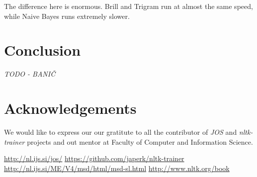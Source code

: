 \documentclass[11pt, conference, compsocconf]{IEEEtran}
\begin{document}
The difference here is enormous. Brill and Trigram run at almost the same speed, while Naive Bayes runs extremely slower.

\section{Conclusion} %
\textit{TODO - BANIČ}

\section*{Acknowledgements}
We would like to express our our gratitute to all the contributor of \textit{JOS} \cite{JOS} and  \textit{nltk-trainer} \cite{nltk-trainer} projects and out mentor at Faculty of Computer and Information Science.

\begin{thebibliography}{99}
 \url{http://nl.ijs.si/jos/}
 \url{https://github.com/japerk/nltk-trainer}
 \url{http://nl.ijs.si/ME/V4/msd/html/msd-sl.html}
 \url{http://www.nltk.org/book}
\end{thebibliography}
\end{document}
